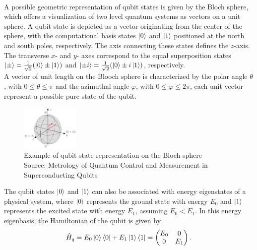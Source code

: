 \paragraph{}
A possible geometric representation of qubit states is given by the Bloch sphere, which offers a visualization of two level quantum systems as vectors on a unit sphere.  
A qubit state is depicted as a vector originating from the center of the sphere, with the computational basis states $\ket{0}$ and $\ket{1}$ positioned at the north and south poles, respectively.
The axis connecting these states defines the $z$-axis. The transverse $x$- and $y$- axes correspond to the equal superposition states $\ket{\pm} = \frac{1}{\sqrt{2}}(\ket{0}\pm\ket{1})$ and $\ket{\pm i} = \frac{1}{\sqrt{2}}(\ket{0}\pm i\ket{1})$, respectively.\\
A vector of unit length on the Blooch sphere is characterized by the polar angle $\theta$, with $0\leq\theta\leq\pi$ and the azimuthal angle $\varphi$, with $0\leq\varphi\leq 2\pi$, each unit vector represent a possible pure state of the qubit.\\

\begin{figure}[h!]
\centering
\includegraphics[width=0.25\textwidth]{figures/png/BlochSphere.png}
\caption{Example of qubit state representation on the Bloch sphere\\
Source: Metrology of Quantum Control and Measurement in Superconducting Qubits \cite{Chen2018}}
\label{fig:BlochSphere}
\end{figure}

The qubit states $\ket{0}$ and $\ket{1}$ can also be associated with energy eigenstates of a physical system, where $\ket{0}$ represents the ground state with energy $E_0$ and $\ket{1}$ represents the excited state with energy $E_1$, assuming $E_0 < E_1$. 
In this energy eigenbasis, the Hamiltonian of the qubit is given by
\begin{equation}\label{eq:qubithamiltonian}
    \hat{H}_q = E_0 \ket{0} \bra{0} + E_1 \ket{1} \bra{1} = 
    \begin{pmatrix}
        E_0 & 0 \\
        0 & E_1
    \end{pmatrix}.
\end{equation}

